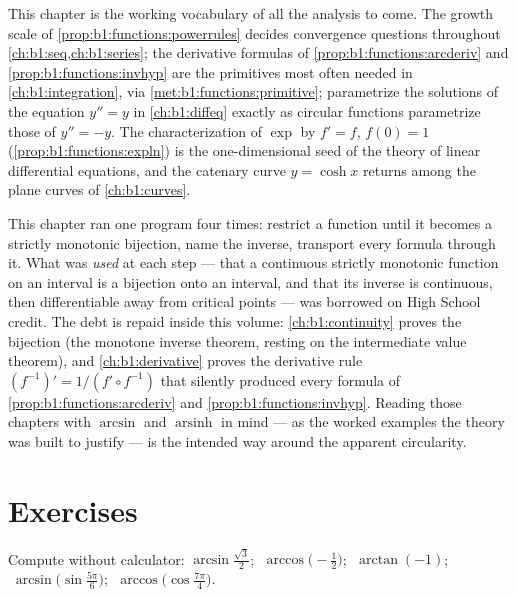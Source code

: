 \begin{remark}\label{rem:b1:functions:whereused}
This chapter is the working vocabulary of all the analysis to come.
The growth scale of \cref{prop:b1:functions:powerrules} decides
convergence questions throughout
\cref{ch:b1:seq,ch:b1:series}; the derivative formulas of
\cref{prop:b1:functions:arcderiv} and
\cref{prop:b1:functions:invhyp} are the primitives most often
needed in \cref{ch:b1:integration}, via
\cref{met:b1:functions:primitive}; 
parametrize the solutions of the equation $y'' = y$ in
\cref{ch:b1:diffeq} exactly as circular functions parametrize
those of $y'' = -y$. The characterization of $\exp$ by $f' = f$,
$f(0) = 1$ (\cref{prop:b1:functions:expln}) is the one-dimensional
seed of the theory of linear differential equations, and the
catenary curve $y = \cosh x$ returns among the plane curves of
\cref{ch:b1:curves}.
\end{remark}

\begin{remark}\label{rem:b1:functions:interlude}
This chapter ran one program four times: restrict a function
until it becomes a strictly monotonic bijection, name the inverse,
transport every formula through it. What was \emph{used} at each
step --- that a continuous strictly monotonic function on an
interval is a bijection onto an interval, and that its inverse is
continuous, then differentiable away from critical points --- was
borrowed on High School credit. The debt is repaid inside this
volume: \cref{ch:b1:continuity} proves the bijection 
(the monotone inverse theorem, resting on the intermediate value
theorem), and \cref{ch:b1:derivative} proves the derivative rule
$(f^{-1})' = 1/(f' \circ f^{-1})$ that silently produced every
formula of \cref{prop:b1:functions:arcderiv} and
\cref{prop:b1:functions:invhyp}. Reading those chapters with
$\arcsin$ and $\operatorname{arsinh}$ in mind --- as the worked
examples the theory was built to justify --- is the intended way
around the apparent circularity.
\end{remark}

\section{Exercises}

\begin{exercise}[$\star$]\label{exo:b1:functions:1}
Compute without calculator: $\arcsin\frac{\sqrt 3}{2}$;
$\;\arccos\bigl(-\frac 12\bigr)$; $\;\arctan(-1)$;
$\;\arcsin\bigl(\sin\frac{5\pi}{6}\bigr)$;
$\;\arccos\bigl(\cos\frac{7\pi}{4}\bigr)$.
\end{exercise}

